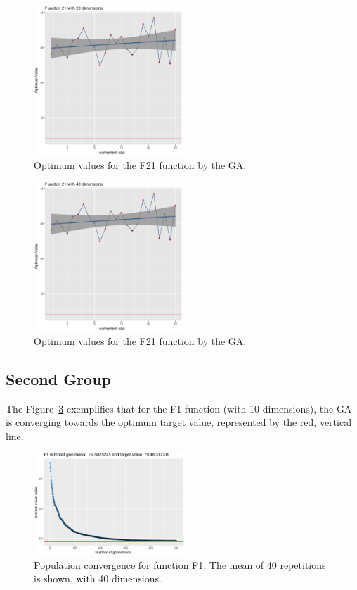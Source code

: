\begin{figure}[H]
	\includegraphics[width=0.5\textwidth]{img/21dim_20.ps}
	\caption{Optimum values for the F21 function by the GA.}
	\label{21dim_20}
\end{figure}

\begin{figure}[H]
	\includegraphics[width=0.5\textwidth]{img/21dim_40.ps}
	\caption{Optimum values for the F21 function by the GA.}
	\label{21dim_40}
\end{figure}

\subsection{Second Group}
The Figure~\ref{convegenceF1} exemplifies that for the F1 function (with 10 dimensions), the GA is converging towards the optimum target value, represented by the red, vertical line. 

\begin{figure}[!ht]
	\includegraphics[width=0.5\textwidth]{img/unnamed-chunk-1-1}
	\caption{Population convergence for function F1. The mean of 40 repetitions is shown, with 40 dimensions.}
	\label{convegenceF1}
\end{figure}


